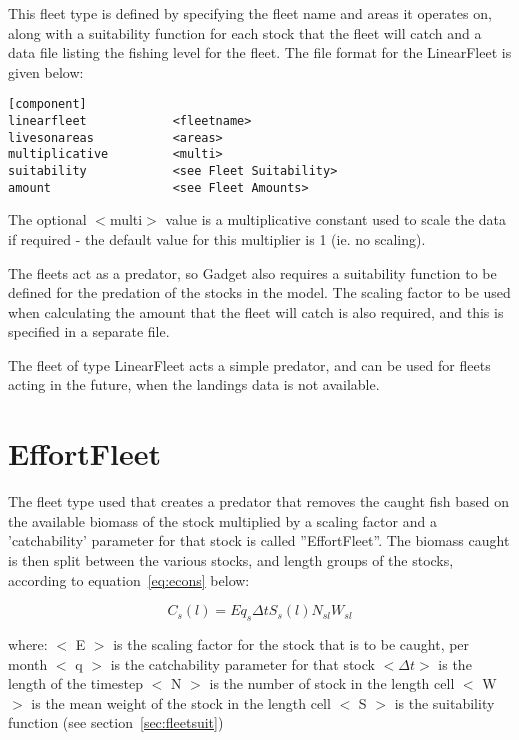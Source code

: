 \documentclass[10pt,twoside]{book}
\begin{document}
\bigskip
This fleet type is defined by specifying the fleet name and areas it operates on, along with a suitability function for each stock that the fleet will catch and a data file listing the fishing level for the fleet.  The file format for the LinearFleet is given below:

{\small\begin{verbatim}
[component]
linearfleet            <fleetname>
livesonareas           <areas>
multiplicative         <multi>
suitability            <see Fleet Suitability>
amount                 <see Fleet Amounts>
\end{verbatim}}

The optional $<$multi$>$ value is a multiplicative constant used to scale the data if required - the default value for this multiplier is 1 (ie. no scaling).

\bigskip
The fleets act as a predator, so Gadget also requires a suitability function to be defined for the predation of the stocks in the model.  The scaling factor to be used when calculating the amount that the fleet will catch is also required, and this is specified in a separate file.

\bigskip
The fleet of type LinearFleet acts a simple predator, and can be used for fleets acting in the future, when the landings data is not available.

\section{EffortFleet}\label{sec:effortfleet}
The fleet type used that creates a predator that removes the caught fish based on the available biomass of the stock multiplied by a scaling factor and a 'catchability' parameter for that stock is called ''EffortFleet''.  The biomass caught is then split between the various stocks, and length groups of the stocks, according to equation~\ref{eq:econs} below:

\begin{equation}\label{eq:econs}
C_{s}(l) = E q_{s} \Delta t S_{s}(l) N_{sl} W_{sl}
\end{equation}

where:\newline
$<$ E $>$ is the scaling factor for the stock that is to be caught, per month\newline
$<$ q $>$ is the catchability parameter for that stock\newline
$<\Delta t>$ is the length of the timestep\newline
$<$ N $>$ is the number of stock in the length cell\newline
$<$ W $>$ is the mean weight of the stock in the length cell\newline
$<$ S $>$ is the suitability function (see section~\ref{sec:fleetsuit})
\end{document}
